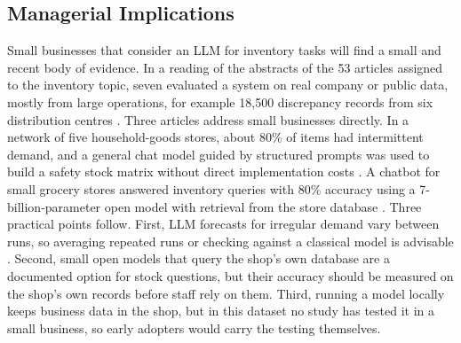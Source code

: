 \subsection{Managerial Implications}
Small businesses that consider an LLM for inventory tasks will find a small and recent body of evidence. In a reading of the abstracts of the 53 articles assigned to the inventory topic, seven evaluated a system on real company or public data, mostly from large operations, for example 18,500 discrepancy records from six distribution centres \parencite{jonnada2026}. Three articles address small businesses directly. In a network of five household-goods stores, about 80\% of items had intermittent demand, and a general chat model guided by structured prompts was used to build a safety stock matrix without direct implementation costs \parencite{cheverda2026}. A chatbot for small grocery stores answered inventory queries with 80\% accuracy using a 7-billion-parameter open model with retrieval from the store database \parencite{burbano2026}. Three practical points follow. First, LLM forecasts for irregular demand vary between runs, so averaging repeated runs or checking against a classical model is advisable \parencite{nakhost2025}. Second, small open models that query the shop's own database are a documented option for stock questions, but their accuracy should be measured on the shop's own records before staff rely on them. Third, running a model locally keeps business data in the shop, but in this dataset no study has tested it in a small business, so early adopters would carry the testing themselves.

